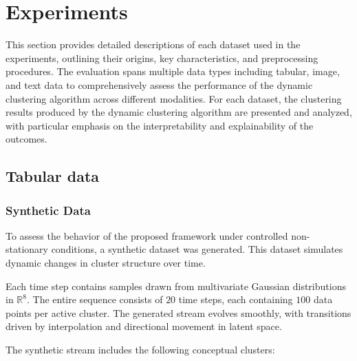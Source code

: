 \chapter{Experiments}\label{ch:experiments}
This section provides detailed descriptions of each dataset used in the
experiments, outlining their origins, key characteristics, and preprocessing
procedures. The evaluation spans multiple data types including tabular, image,
and text data to comprehensively assess the performance of the dynamic
clustering algorithm across different modalities. For each dataset, the
clustering results produced by the dynamic clustering algorithm are presented
and analyzed, with particular emphasis on the interpretability and
explainability of the outcomes.

\section{Tabular data}\label{sec:tabular_data}

\subsection{Synthetic Data}\label{subsec:sythetic_data}

To assess the behavior of the proposed framework under controlled
non-stationary conditions, a synthetic dataset was generated. This dataset
simulates dynamic changes in cluster structure over time.

Each time step contains samples drawn from multivariate Gaussian distributions
in $\mathbb{R}^8$. The entire sequence consists of $20$ time steps, each
containing $100$ data points per active cluster. The generated stream evolves
smoothly, with transitions driven by interpolation and directional movement in
latent space.

The synthetic stream includes the following conceptual clusters:

